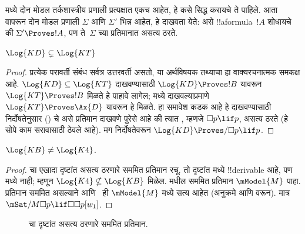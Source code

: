 \documentclass[../../../include/open-logic-section]{subfiles}
\begin{document}


 मध्ये दोन मोडल तर्कशास्त्रीय
प्रणाली प्रत्यक्षात एकच आहेत, हे कसे सिद्ध करायचे
ते पाहिले. आता~
वापरून दोन मोडल प्रणाली $\Sigma$ आणि $\Sigma'$
भिन्न आहेत, हे दाखवता येते: असे !!a{formula}~$!A$
शोधायचे की $\Sigma' \Proves !A$, पण ते~$\Sigma$
च्या प्रतिमानात असत्य ठरते.

\begin{prop}
  $\Log{KD} \subsetneq \Log{KT}$
\end{prop}

\begin{proof} प्रत्येक परावर्ती संबंध सर्वत्र उत्तरवर्ती असतो,
  या अर्थविषयक तथ्याचा हा वाक्यरचनात्मक समकक्ष आहे.
  $\Log{KD} \subseteq \Log{KT}$ दाखवण्यासाठी
  $\Log{KD} \Proves !B$ यावरून
  $\Log{KT} \Proves !B$ मिळते हे पाहावे लागेल;
  मध्ये दाखवल्याप्रमाणे $\Log{KT} \Proves
  \Ax{D}$ यावरून हे मिळते. हा समावेश कडक आहे हे
  दाखवण्यासाठी निर्दोषतेनुसार
  ()  चे असे
  प्रतिमान दाखवणे पुरेसे आहे की त्यात
  , म्हणजे $\Box p \lif p$, असत्य ठरते
  (हे सोपे काम सरावासाठी ठेवले आहे). मग निर्दोषतेवरून
  $\Log{KD} \Proves/ \Box p \lif p$.
\end{proof}

\begin{prop}
  $\Log{KB} \neq \Log{K4}$.
\end{prop}

\begin{proof}
   चा एखादा दृष्टांत असत्य ठरणारे सममित
  प्रतिमान रचू. तो दृष्टांत  मध्ये
  !!{derivable} आहे, पण  मध्ये नाही;
  म्हणून $\Log{K4} \nsubseteq \Log{KB}$ मिळेल.
   मधील सममित प्रतिमान
  $\mModel{M}$ पाहा. प्रतिमान सममित असल्याने
   आणि~ ही $\mModel{M}$ मध्ये सत्य
  आहेत (अनुक्रमे 
  आणि  वरून).
  मात्र $\mSat/{M}{\Box p \lif \Box\Box p}[w_1]$.
\end{proof}

\begin{figure}[htpb]
  \centering
  \caption{ चा दृष्टांत असत्य ठरणारे सममित प्रतिमान.}
\end{figure}
\end{document}

